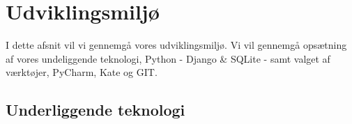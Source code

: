 \documentclass[]{article}
\begin{document}
\pagebreak[3]


\section{Udviklingsmiljø} \label{Udviklingsmiljo}
I dette afsnit vil vi gennemgå vores udviklingsmiljø. Vi vil gennemgå opsætning af vores undeliggende teknologi, Python - Django \& SQLite - samt valget af værktøjer, PyCharm, Kate og GIT.

\subsection{Underliggende teknologi}
\end{document}
